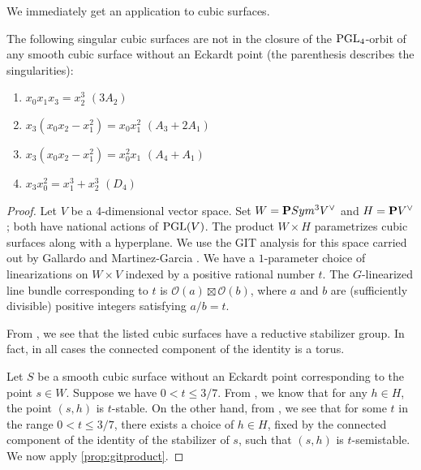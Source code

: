 \documentclass[12pt,reqno]{amsart}
\numberwithin{equation}{section}
\renewcommand{\O}{\mathcal O}
\begin{document}
We immediately get an application to cubic surfaces.
\begin{proposition}\label{prop:isogood}
  The following singular cubic surfaces are not in the closure of the $\PGL_4$-orbit of any smooth cubic surface without an Eckardt point (the parenthesis describes the singularities):
  \begin{enumerate}
  \item $x_0x_1x_3 = x_2^3$ \quad $(3A_2)$
  \item $x_3(x_0x_2-x_1^2) = x_0x_1^2$ \quad $(A_3 + 2A_1)$
  \item $x_3(x_0x_2-x_1^2) = x_0^2x_1$ \quad $(A_4 + A_1)$
  \item $x_3x_0^2 = x_1^3 + x_2^3$ \quad $(D_4)$
  \end{enumerate}
\end{proposition}
\begin{proof}
  Let $V$ be a 4-dimensional vector space.
  Set $W = \P Sym^3 V^\vee$ and $H = \P V^\vee$; both have national actions of $\PGL(V)$.
  The product $W \times H$ parametrizes cubic surfaces along with a hyperplane.
  We use the GIT analysis for this space carried out by Gallardo and Martinez-Garcia \cite{gal.mar:19}.
  We have a $1$-parameter choice of linearizations on $W \times V$ indexed by a positive rational number $t$.
  The $G$-linearized line bundle corresponding to $t$ is $\O(a) \boxtimes \O(b)$, where $a$ and $b$ are (sufficiently divisible) positive integers satisfying $a/b = t$.

  From \cite[Theorem~3]{sak:10}, we see that the listed cubic surfaces have a reductive stabilizer group.
  In fact, in all cases the connected component of the identity is a torus.

  Let $S$ be a smooth cubic surface without an Eckardt point corresponding to the point $s \in W$.
  Suppose we have $0 < t \leq 3/7$.
  From \cite[Theorem~2]{gal.mar:19}, we know that for any $h \in H$, the point $(s,h)$ is $t$-stable.
  On the other hand, from \cite[Table 2]{gal.mar:19}, we see that for some $t$ in the range $0 < t \leq 3/7$, there exists a choice of $h \in H$, fixed by the connected component of the identity of the stabilizer of $s$, such that $(s,h)$ is $t$-semistable.
  We now apply \autoref{prop:gitproduct}.


\end{proof}
\end{document}
